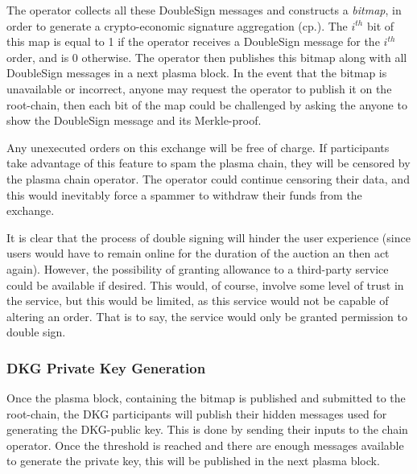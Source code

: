 \documentclass[11pt,parskip=full]{scrartcl}%
\begin{document}
The operator collects all these DoubleSign messages and constructs a \emph{bitmap}, in order to generate a crypto-economic signature aggregation (cp.\cite{sig}). 
The $i^{th}$ bit of this map is equal to 1 if the operator receives a DoubleSign message for the $i^{th}$ order, and is 0 otherwise.
The operator then publishes this bitmap along with all DoubleSign messages in a next plasma block. 
In the event that the bitmap is unavailable or incorrect, anyone may request the operator to publish it on the root-chain, then each bit of the map could be challenged by asking the anyone to show the DoubleSign message and its Merkle-proof. 

Any unexecuted orders on this exchange will be free of charge. 
If participants take advantage of this feature to spam the plasma chain, they will be censored by the plasma chain operator. 
The operator could continue censoring their data, and this would inevitably force a spammer to withdraw their funds from the exchange.

It is clear that the process of double signing will hinder the user experience (since users would have to remain online for the duration of the auction an then act again). 
However, the possibility of granting allowance to a third-party service could be available if desired.
This would, of course, involve some level of trust in the service, but this would be limited, as this service would not be capable of altering an order. That is to say, the service would only be granted permission to double sign.

\subsubsection{DKG Private Key Generation}
Once the plasma block, containing the bitmap is published and submitted to the root-chain, the DKG participants will publish their hidden messages used for generating the DKG-public key. 
This is done by sending their inputs to the chain operator.
Once the threshold is reached and there are enough messages available to generate the private key, this will be published in the next plasma block. 
\end{document}
